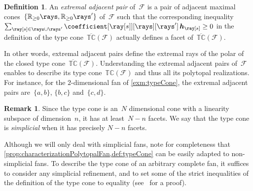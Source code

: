 \documentclass{amsart}
\theoremstyle{definition}
\newtheorem{definition}[theorem]{Definition}
\newtheorem{remark}[theorem]{Remark}
\newcommand{\R}{\mathbb{R}} %
\renewcommand{\b}[1]{{\boldsymbol{#1}}} %
\newcommand{\darkblue}{\color{darkblue}} %
\newcommand{\defn}[1]{\textsl{\darkblue #1}} %
\newcommand{\Fan}{\mathcal{F}} %
\newcommand{\typeCone}{\mathbb{TC}} %
\newcommand{\ctypeCone}{\overline{\mathbb{TC}}} %
\begin{document}
\begin{definition}
An \defn{extremal adjacent pair} of~$\Fan$ is a pair of adjacent maximal cones~$\{\R_{\ge0}\rays, \R_{\ge0}\rays'\}$ of~$\Fan$ such that the corresponding inequality $\sum_{\ray[s] \in \rays \cup \rays'} \coefficient[{\ray[s]}][\rays][\rays'] \, \b{h}_{\ray[s]} \geq 0$ in the definition of the type cone~$\ctypeCone(\Fan)$ actually defines a facet of~$\ctypeCone(\Fan)$.
\end{definition}

In other words, extremal adjacent pairs define the extremal rays of the polar of the closed type cone~$\ctypeCone(\Fan)$.
Understanding the extremal adjacent pairs of~$\Fan$ enables to describe its type cone~$\typeCone(\Fan)$ and thus all its polytopal realizations.
For instance, for the $2$-dimensional fan of \cref{exm:typeCone}, the extremal adjacent pairs are~$\{a,b\}$, $\{b,c\}$ and~$\{c,d\}$.

\begin{remark}
\label{rem:dimTypeCone}
Since the type cone is an~$N$ dimensional cone with a linearity subspace of dimension~$n$, it has at least~$N-n$ facets.
We say that the type cone is \defn{simplicial} when it has precisely $N-n$ facets.
\end{remark}

Although we will only deal with simplicial fans, note for completeness that \cref{prop:characterizationPolytopalFan,def:typeCone} can be easily adapted to non-simplicial fans. To describe the type cone of an arbitrary complete fan, it suffices to consider any simplicial refinement, and to set some of the strict inequalities of the definition of the type cone to equality (see~\cite[Prop.~3]{PilaudSantos-quotientopes} for a proof).
\end{document}
